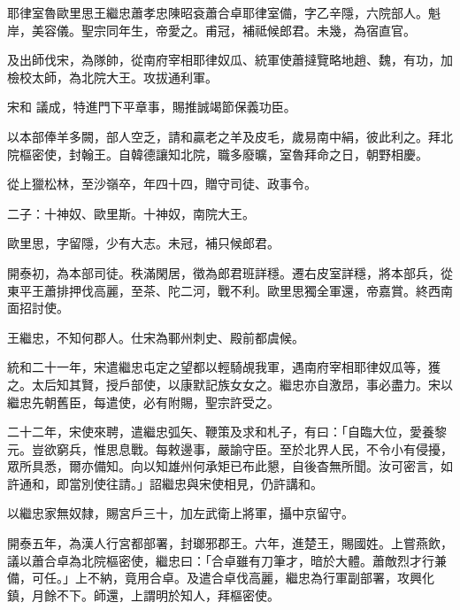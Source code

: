 
\begin{pinyinscope}

 耶律室魯歐里思王繼忠蕭孝忠陳昭袞蕭合卓耶律室備，字乙辛隱，六院部人。魁岸，美容儀。聖宗同年生，帝愛之。甫冠，補祗候郎君。未幾，為宿直官。



 及出師伐宋，為隊帥，從南府宰相耶律奴瓜、統軍使蕭撻覽略地趙、魏，有功，加檢校太師，為北院大王。攻拔通利軍。



 宋和
 議成，特進門下平章事，賜推誠竭節保義功臣。



 以本部俸羊多闕，部人空乏，請和贏老之羊及皮毛，歲易南中絹，彼此利之。拜北院樞密使，封翰王。自韓德讓知北院，職多廢曠，室魯拜命之日，朝野相慶。



 從上獵松林，至沙嶺卒，年四十四，贈守司徒、政事令。



 二子：十神奴、歐里斯。十神奴，南院大王。



 歐里思，字留隱，少有大志。未冠，補只候郎君。



 開泰初，為本部司徒。秩滿閑居，徵為郎君班詳穩。遷右皮室詳穩，將本部兵，從東平王蕭排押伐高麗，至茶、陀二河，戰不利。歐里思獨全軍還，帝嘉賞。終西南面招討使。



 王繼忠，不知何郡人。仕宋為鄆州刺史、殿前都虞候。



 統和二十一年，宋遣繼忠屯定之望都以輕騎覘我軍，遇南府宰相耶律奴瓜等，獲之。太后知其賢，授戶部使，以康默記族女女之。繼忠亦自激昂，事必盡力。宋以繼忠先朝舊臣，每遣使，必有附賜，聖宗許受之。



 二十二年，宋使來聘，遣繼忠弧矢、鞭策及求和札子，有曰：「自臨大位，愛養黎元。豈欲窮兵，惟思息戰。每敕邊事，嚴諭守臣。至於北界人民，不令小有侵擾，眾所具悉，爾亦備知。向以知雄州何承矩已布此懇，自後杳無所聞。汝可密言，如許通和，即當別使往請。」詔繼忠與宋使相見，仍許講和。



 以繼忠家無奴隸，賜宮戶三十，加左武衛上將軍，攝中京留守。



 開泰五年，為漢人行宮都部署，封瑯邪郡王。六年，進楚王，賜國姓。上嘗燕飲，議以蕭合卓為北院樞密使，繼忠曰：「合卓雖有刀筆才，暗於大體。蕭敵烈才行兼備，可任。」上不納，竟用合卓。及遣合卓伐高麗，繼忠為行軍副部署，攻興化鎮，月餘不下。師還，上謂明於知人，拜樞密使。




\end{pinyinscope}
